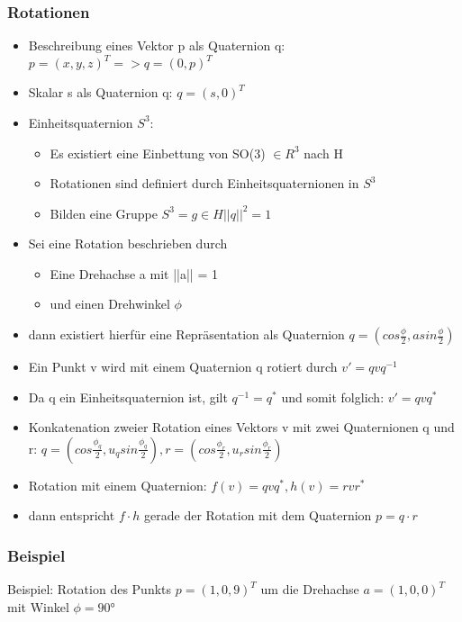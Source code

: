 \documentclass[paper=a4, fontsize=11pt]{scrartcl} %
\numberwithin{equation}{section} %
\numberwithin{figure}{section} %
\numberwithin{table}{section} %
\begin{document}
\begin{itemize}
\subsubsection{Rotationen}

\begin{itemize}
\item Beschreibung eines Vektor p als Quaternion q: $p = (x,y,z)^T => q = (0,p)^T$
\item Skalar s als Quaternion q: $q = (s,0)^T$
\item Einheitsquaternion $S^3$:
\begin{itemize}
\item Es existiert eine Einbettung von SO(3) $\in R^3$ nach H
\item Rotationen sind definiert durch Einheitsquaternionen in $S^3$
\item Bilden eine Gruppe $S^3 = { g \in H {||q||}^2 = 1 }$
\end{itemize}
\item Sei eine Rotation beschrieben durch
\begin{itemize}
\item Eine Drehachse a mit ||a|| = 1
\item und einen Drehwinkel $\phi$
\end{itemize}
\item dann existiert hierfür eine Repräsentation als Quaternion $q = (cos \frac{\phi}{2}, a sin \frac{\phi}{2})$
\item Ein Punkt v wird mit einem Quaternion q rotiert durch $v' = qvq^{-1}$
\item Da q ein Einheitsquaternion ist, gilt $q^{-1} = q^*$ und somit folglich: $v' = qvq^*$
\item Konkatenation zweier Rotation eines Vektors v mit zwei Quaternionen q und r: $q = (cos \frac{\phi_q}{2}, u_q sin \frac{\phi_q}{2}), r = (cos \frac{\phi_r}{2}, u_r sin \frac{\phi_r}{2})$
\item Rotation mit einem Quaternion: $f(v) = qvq^*, h(v) = rvr^*$
\item dann entspricht $f \cdot h$ gerade der Rotation mit dem Quaternion $p = q \cdot r$
\end{itemize}

\subsubsection{Beispiel}
Beispiel: Rotation des Punkts $p = (1,0,9)^T$ um die Drehachse $a = (1,0,0)^T$ mit Winkel $\phi = 90°$


\end{itemize}
\end{document}
